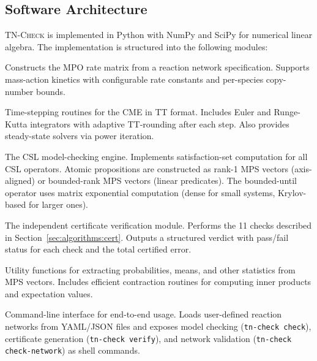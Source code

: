 \documentclass[11pt]{article}
\newcommand{\tncheck}{\textsc{TN-Check}}
\begin{document}
\subsection{Software Architecture}

\tncheck{} is implemented in Python with NumPy and SciPy for
numerical linear algebra.
The implementation is structured into the following modules:

\begin{description}[leftmargin=1em,itemsep=2pt]
\item[\texttt{generator/}]
  Constructs the MPO rate matrix from a reaction network specification.
  Supports mass-action kinetics with configurable rate constants
  and per-species copy-number bounds.

\item[\texttt{solver/}]
  Time-stepping routines for the CME in TT format.
  Includes Euler and Runge-Kutta integrators with adaptive
  TT-rounding after each step.
  Also provides steady-state solvers via power iteration.

\item[\texttt{verifier/}]
  The CSL model-checking engine.
  Implements satisfaction-set computation for all CSL operators.
  Atomic propositions are constructed as rank-1 MPS vectors
  (axis-aligned) or bounded-rank MPS vectors (linear predicates).
  The bounded-until operator uses matrix exponential computation
  (dense for small systems, Krylov-based for larger ones).

\item[\texttt{certificate/}]
  The independent certificate verification module.
  Performs the 11 checks described in Section~\ref{sec:algorithms:cert}.
  Outputs a structured verdict with pass/fail status for each check
  and the total certified error.

\item[\texttt{evaluator/}]
  Utility functions for extracting probabilities, means, and
  other statistics from MPS vectors.
  Includes efficient contraction routines for computing inner
  products and expectation values.

\item[\texttt{cli}]
  Command-line interface for end-to-end usage.
  Loads user-defined reaction networks from YAML/JSON files and
  exposes model checking (\texttt{tn-check check}), certificate
  generation (\texttt{tn-check verify}), and network validation
  (\texttt{tn-check check-network}) as shell commands.
\end{description}
\end{document}
